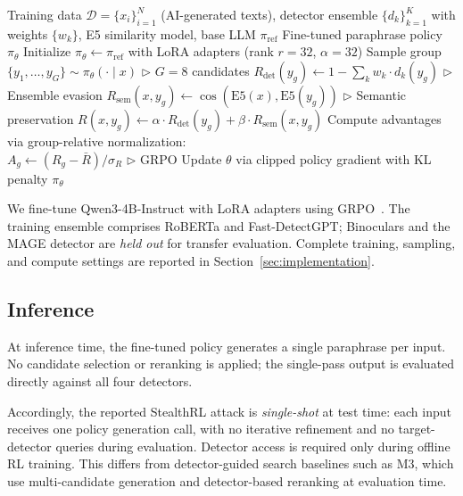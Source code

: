 \documentclass[11pt]{article}
\begin{document}
\begin{algorithm}[t]
\caption{StealthRL Training}
\label{alg:stealthrl}
\begin{algorithmic}[1]
\REQUIRE Training data $\mathcal{D} = \{x_i\}_{i=1}^N$ (AI-generated texts), detector ensemble $\{d_k\}_{k=1}^K$ with weights $\{w_k\}$, E5 similarity model, base LLM $\pi_{\text{ref}}$
\ENSURE Fine-tuned paraphrase policy $\pi_\theta$
\STATE Initialize $\pi_\theta \leftarrow \pi_{\text{ref}}$ with LoRA adapters (rank $r{=}32$, $\alpha{=}32$)
      \STATE Sample group $\{y_1, \ldots, y_G\} \sim \pi_\theta(\cdot \mid x)$ \hfill $\triangleright$ $G{=}8$ candidates
        \STATE $R_{\text{det}}(y_g) \leftarrow 1 - \sum_{k} w_k \cdot d_k(y_g)$ \hfill $\triangleright$ Ensemble evasion
        \STATE $R_{\text{sem}}(x, y_g) \leftarrow \cos(\text{E5}(x), \text{E5}(y_g))$ \hfill $\triangleright$ Semantic preservation
        \STATE $R(x, y_g) \leftarrow \alpha \cdot R_{\text{det}}(y_g) + \beta \cdot R_{\text{sem}}(x, y_g)$
      \ENDFOR
      \STATE Compute advantages via group-relative normalization: \\ \quad $A_g \leftarrow (R_g - \bar{R}) / \sigma_R$ \hfill $\triangleright$ GRPO
    \ENDFOR
    \STATE Update $\theta$ via clipped policy gradient with KL penalty
  \ENDFOR
\ENDFOR
\RETURN $\pi_\theta$
\end{algorithmic}
\end{algorithm}

We fine-tune Qwen3-4B-Instruct with LoRA adapters using GRPO~\cite{pang2025grpo}. The training ensemble comprises RoBERTa and Fast-DetectGPT; Binoculars and the MAGE detector are \emph{held out} for transfer evaluation. Complete training, sampling, and compute settings are reported in Section~\ref{sec:implementation}.

\subsection{Inference}
\label{sec:inference}

At inference time, the fine-tuned policy generates a single paraphrase per input. No candidate selection or reranking is applied; the single-pass output is evaluated directly against all four detectors.

Accordingly, the reported StealthRL attack is \emph{single-shot} at test time: each input receives one policy generation call, with no iterative refinement and no target-detector queries during evaluation. Detector access is required only during offline RL training. This differs from detector-guided search baselines such as M3, which use multi-candidate generation and detector-based reranking at evaluation time.
\end{document}
